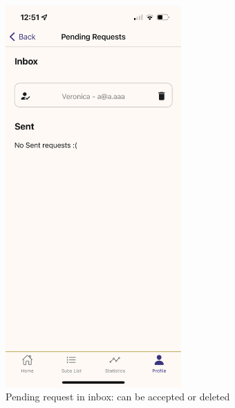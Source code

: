 \documentclass[11pt]{article}
\begin{document}
\begin{figure}[h!]
    \centering
    \begin{minipage}[c]{0.45\textwidth}
        \centering
        \includegraphics[width=0.6\textwidth, clip]{../../assets/smartphone/pendingIn.PNG}
        \caption{Pending request in inbox: can be accepted or deleted}
        \label{fig:pendingIn}
    \end{minipage}\hspace{1cm}%
    \begin{minipage}[c]{0.45\textwidth}
        \centering

\end{minipage}
\end{figure}
\end{document}

